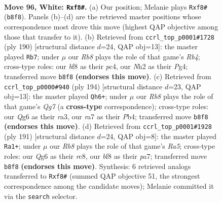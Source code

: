 \documentclass[11pt]{article}
\begin{document}
\clearpage

\begin{figure}[p]\centering
\begin{subfigure}{0.46\textwidth}\centering
\resizebox{\linewidth}{!}{%
\newchessgame
\chessboard[
  setfen={1R3b1k/r7/6Q1/7K/8/8/7N/8 w - - 2 96},
  showmover=false,
  pgfstyle=straightmove, color=movearrow, markmove={b8-f8}
]}
\caption{}
\end{subfigure}\hfill
\begin{subfigure}{0.46\textwidth}\centering
\resizebox{\linewidth}{!}{%
\newchessgame
\chessboard[
  setfen={r7/2K1k3/8/8/1Rp3P1/8/8/8 w - - 15 96},
  showmover=false,
  pgfstyle=straightmove, color=movearrow, markmove={b4-b7}
]}
\caption{}
\end{subfigure}
\\[4pt]
\begin{subfigure}{0.46\textwidth}\centering
\resizebox{\linewidth}{!}{%
\newchessgame
\chessboard[
  setfen={8/b5Q1/3k4/7p/1P2K3/r7/8/8 w - - 1 98},
  showmover=false,
  pgfstyle=straightmove, color=movearrow, markmove={g7-h6}
]}
\caption{}
\end{subfigure}\hfill
\begin{subfigure}{0.46\textwidth}\centering
\resizebox{\linewidth}{!}{%
\newchessgame
\chessboard[
  setfen={2R5/P3b3/8/8/r7/3k4/8/3K4 b - - 8 96},
  showmover=false,
  pgfstyle=straightmove, color=movearrow, markmove={a4-a1}
]}
\caption{}
\end{subfigure}
\caption{\textbf{Move 96, White: \texttt{Rxf8\#}.} (a) Our position; Melanie plays \texttt{Rxf8\#} (\texttt{b8f8}). Panels (b)--(d) are the retrieved master positions whose correspondence most drove this move (highest QAP objective among those that transfer to it). (b) Retrieved from \texttt{ccrl\_top\_p0001\#1728} (ply 190) [structural distance $d$=24, QAP obj=13]: the master played \texttt{Rb7}; under $\mu$ our \emph{Rb8} plays the role of that game's \emph{Rb4}; cross-type roles: our \emph{b}f8 as their \emph{p}c4, our \emph{N}h2 as their \emph{P}g4; transferred move \texttt{b8f8} \textbf{(endorses this move)}. (c) Retrieved from \texttt{ccrl\_top\_p0000\#940} (ply 194) [structural distance $d$=23, QAP obj=13]: the master played \texttt{Qh6+}; under $\mu$ our \emph{Rb8} plays the role of that game's \emph{Qg7} (a \textbf{cross-type} correspondence); cross-type roles: our \emph{Q}g6 as their \emph{r}a3, our \emph{r}a7 as their \emph{P}b4; transferred move \texttt{b8f8} \textbf{(endorses this move)}. (d) Retrieved from \texttt{ccrl\_top\_p0001\#1928} (ply 191) [structural distance $d$=24, QAP obj=8]: the master played \texttt{Ra1+}; under $\mu$ our \emph{Rb8} plays the role of that game's \emph{Ra5}; cross-type roles: our \emph{Q}g6 as their \emph{r}c8, our \emph{b}f8 as their \emph{p}a7; transferred move \texttt{b8f8} \textbf{(endorses this move)}. Synthesis: 6 retrieved analogs transferred to \texttt{Rxf8\#} (summed QAP objective 51, the strongest correspondence among the candidate moves); Melanie committed it via the \texttt{search} selector.}
\label{fig:thought-m190}
\end{figure}
\end{document}
